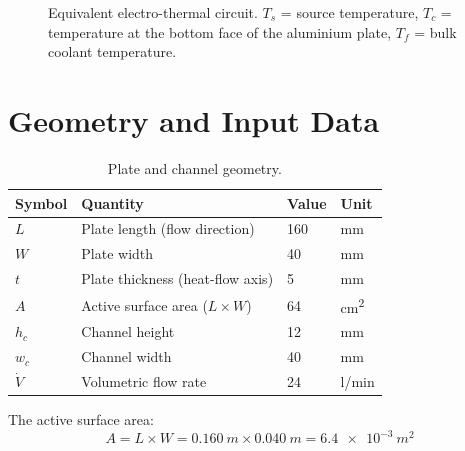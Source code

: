 \documentclass[a4paper,11pt]{article}
\begin{document}
\begin{figure}[H]
\centering
{}
\caption{Equivalent electro-thermal circuit. $T_s$ = source temperature,
         $T_c$ = temperature at the bottom face of the aluminium plate,
         $T_f$ = bulk coolant temperature.}
\label{fig:circuit}
\end{figure}

\section{Geometry and Input Data}

\begin{table}[H]
\centering
\caption{Plate and channel geometry.}
\begin{tabular}{llll}
\toprule
Symbol & Quantity & Value & Unit \\
\midrule
$L$    & Plate length (flow direction)    & 160  & \si{mm} \\
$W$    & Plate width                      & 40   & \si{mm} \\
$t$    & Plate thickness (heat-flow axis) & 5    & \si{mm} \\
$A$    & Active surface area ($L\times W$) & 64  & \si{cm^2} \\
$h_c$  & Channel height                   & 12   & \si{mm} \\
$w_c$  & Channel width                    & 40   & \si{mm} \\
$\dot{V}$ & Volumetric flow rate          & 24   & \si{l/min} \\
\bottomrule
\end{tabular}
\end{table}

The active surface area:
\begin{equation}
  A = L \times W = \SI{0.160}{m} \times \SI{0.040}{m} = \SI{6.4e-3}{m^2}
\end{equation}
\end{document}
